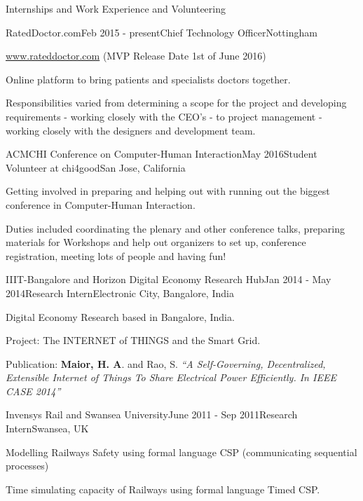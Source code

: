 \documentclass{resume} %
\begin{document}
\begin{rSection}{Internships and Work Experience and Volunteering}
    \begin{rSubsection}{RatedDoctor.com}{Feb 2015 - present}{Chief Technology Officer}{Nottingham}
        \item \url{www.rateddoctor.com} (MVP Release Date 1st of June 2016)
        \item Online platform to bring patients and specialists doctors together.
        \item Responsibilities varied from determining a scope for the project and developing requirements - working closely with the CEO’s - to project management - working closely with the designers and development team.
    \end{rSubsection}

\begin{rSubsection}{ACMCHI Conference on  Computer-Human Interaction}{May 2016}{Student Volunteer at chi4good}{San Jose, California}
        \item Getting involved in preparing and helping out with running out the biggest conference in Computer-Human Interaction.
        \item Duties included coordinating the plenary and other conference talks, preparing materials for Workshops and help out organizers to set up, conference registration, meeting lots of people and having fun!
    \end{rSubsection}

\begin{rSubsection}{IIIT-Bangalore and Horizon Digital Economy Research Hub}{Jan 2014 - May 2014}{Research Intern}{Electronic City, Bangalore, India}
\item Digital Economy Research based in Bangalore, India.
\item Project: The INTERNET of THINGS and the Smart Grid.
\item Publication: \textbf{Maior, H. A}. and Rao, S.  \emph{``A Self-Governing, Decentralized, Extensible Internet of Things To Share Electrical Power Efficiently. In IEEE CASE 2014''}
\end{rSubsection}
\begin{rSubsection}{Invensys Rail and Swansea University}{June 2011 - Sep 2011}{Research Intern}{Swansea, UK}
\item Modelling Railways Safety using formal language CSP (communicating sequential processes)
\item Time simulating capacity of Railways using formal language Timed CSP.
\end{rSubsection}


\end{rSection}
\end{document}
